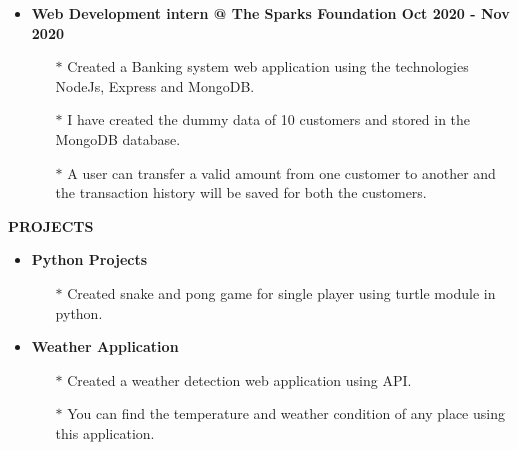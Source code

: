 \documentclass{article}
\begin{document}
{{{{{{\begin{itemize}
\end{itemize}
\begin{itemize}
\item   {\bf Web Development intern @ The Sparks Foundation {\hfill Oct 2020 - Nov 2020}}
\vspace{-2mm}
\begin{itemize}
  \vspace{0.5mm}
  \item[$\ast$] Created a Banking system web application using the technologies NodeJs, Express and MongoDB. 
  \vspace{-0.5mm}
  \item[$\ast$] I have created the dummy data of 10 customers and stored in the MongoDB database.
  \vspace{-0.5mm}
  \item[$\ast$] A user can transfer a valid amount from one customer to another and the transaction history will be saved for both the customers.  
\end{itemize}

\end{itemize}




\vspace{4mm}

{\medskip
\large { {\bf  \color[rgb]{0,0,1} PROJECTS}} \hrulefill \par
\normalsize

\begin{itemize}


\item   {\bf Python Projects}
\vspace{-2mm}
\begin{itemize}
  \vspace{0.5mm}
  \item[$\ast$] Created snake and pong game for single player using turtle module in python.
 
\end{itemize}


\item   {\bf Weather Application}
\vspace{-2mm}
\begin{itemize}
  \vspace{0.5mm}
  \item[$\ast$] Created a weather detection web application using API.
  \vspace{-0.5mm}
  \item[$\ast$] You can find the temperature and weather condition of any place using this application.
\end{itemize}


\end{itemize}}}}}}}}
\end{document}
